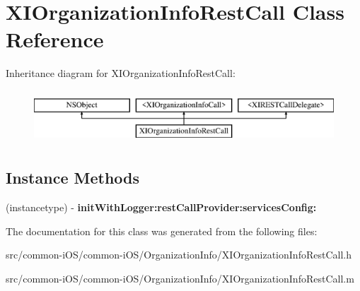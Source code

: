 \hypertarget{interface_x_i_organization_info_rest_call}{}\section{X\+I\+Organization\+Info\+Rest\+Call Class Reference}
\label{interface_x_i_organization_info_rest_call}
Inheritance diagram for X\+I\+Organization\+Info\+Rest\+Call\+:\begin{figure}[H]
\begin{center}
\leavevmode
\includegraphics[height=2.000000cm]{interface_x_i_organization_info_rest_call}
\end{center}
\end{figure}
\subsection*{Instance Methods}
\begin{DoxyCompactItemize}
\item 
\hypertarget{interface_x_i_organization_info_rest_call_a1225a21a0db363c0a512ce6ae22d9159}{}\label{interface_x_i_organization_info_rest_call_a1225a21a0db363c0a512ce6ae22d9159} 
(instancetype) -\/ {\bfseries init\+With\+Logger\+:rest\+Call\+Provider\+:services\+Config\+:}
\end{DoxyCompactItemize}


The documentation for this class was generated from the following files\+:\begin{DoxyCompactItemize}
\item 
src/common-\/i\+O\+S/common-\/i\+O\+S/\+Organization\+Info/X\+I\+Organization\+Info\+Rest\+Call.\+h\item 
src/common-\/i\+O\+S/common-\/i\+O\+S/\+Organization\+Info/X\+I\+Organization\+Info\+Rest\+Call.\+m\end{DoxyCompactItemize}
